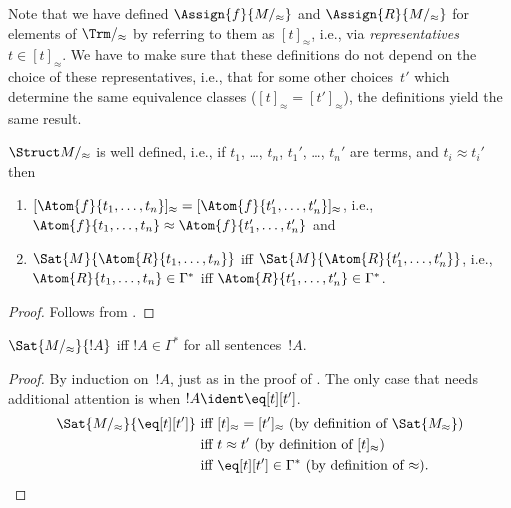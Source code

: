 \documentclass[../../include/open-logic-section]{subfiles}
\begin{document}
\begin{explain}
Note that we have defined $\Assign{f}{M/_\approx}$ and
$\Assign{R}{M/_\approx}$ for elements of $\Trm/_\approx$ by referring
to them as $[t]_\approx$, i.e., via \emph{representatives}~$t \in
[t]_\approx$.  We have to make sure that these definitions do not
depend on the choice of these representatives, i.e., that for some
other choices~$t'$ which determine the same equivalence classes
($[t]_\approx = [t']_\approx$), the definitions yield the same result.
\end{explain}

\begin{prop}
$\Struct M/_\approx$ is well defined, i.e., if $t_1$, \dots, $t_n$,
  $t_1'$, \dots, $t_n'$ are terms, and $t_i \approx t_i'$ then
\begin{enumerate}
\item $[\Atom{f}{t_1,\dots, t_n}]_\approx = [\Atom{f}{t_1',\dots,
    t_n'}]_\approx$, i.e., $\Atom{f}{t_1,\dots, t_n} \approx
  \Atom{f}{t_1',\dots, t_n'}$ and
\item $\Sat{M}{\Atom{R}{t_1,\dots, t_n}}$ iff
  $\Sat{M}{\Atom{R}{t_1',\dots, t_n'}}$, i.e., $\Atom{R}{t_1,\dots,
  t_n} \in \Gamma^*$ iff $\Atom{R}{t_1',\dots, t_n'} \in \Gamma^*$.
\end{enumerate}
\end{prop}

\begin{proof}
Follows from .
\end{proof}

\begin{prop}
$\Sat{M/_\approx}{!A}$ iff $!A \in \Gamma^*$ for all
  sentences~$!A$.
\end{prop}

\begin{proof}
By induction on~$!A$, just as in the proof of .
The only case that needs additional attention is when $!A \ident
\eq[t][t']$.
\begin{align*}
\Sat{M/_\approx}{\eq[t][t']} & \text{ iff } [t]_\approx = [t']_\approx
\text{ (by definition of $\Sat{M_\approx}$)}\\ 
& \text{ iff } t \approx t' \text{ (by definition of $[t]_\approx$)}\\ 
& \text{ iff } \eq[t][t'] \in \Gamma^* \text{ (by definition of $\approx$).}
\end{align*}
\end{proof}
\end{document}
